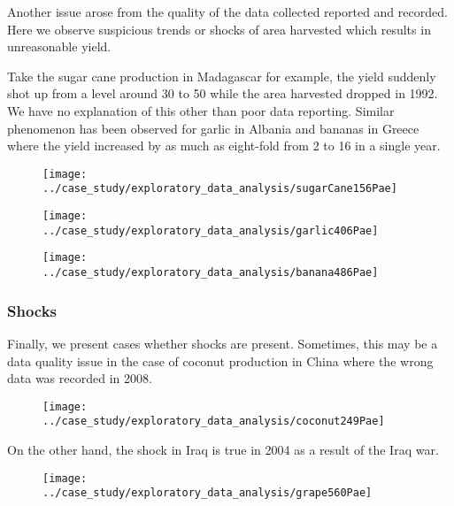 \documentclass[nojss]{jss}\usepackage[]{graphicx}\usepackage[]{color}
\begin{document}
Another issue arose from the quality of the data collected reported
and recorded. Here we observe suspicious trends or shocks of area
harvested which results in unreasonable yield.

Take the sugar cane production in Madagascar for example, the yield
suddenly shot up from a level around 30 to 50 while the area harvested
dropped in 1992. We have no explanation of this other than poor data
reporting. Similar phenomenon has been observed for garlic in Albania
and bananas in Greece where the yield increased by as much as
eight-fold from 2 to 16 in a single year.

\begin{figure}[!ht]
  \centering \texttt{[image: ../case\_study/exploratory\_data\_analysis/sugarCane156Pae]}
\end{figure}

\begin{figure}[!ht]
  \centering
  \texttt{[image: ../case\_study/exploratory\_data\_analysis/garlic406Pae]}
\end{figure}

\begin{figure}[!ht]
  \centering
  \texttt{[image: ../case\_study/exploratory\_data\_analysis/banana486Pae]}
\end{figure}




\FloatBarrier
\subsubsection{Shocks}

Finally, we present cases whether shocks are present. Sometimes, this
may be a data quality issue in the case of coconut production in China
where the wrong data was recorded in 2008.

\begin{figure}[!ht]
  \centering
  \texttt{[image: ../case\_study/exploratory\_data\_analysis/coconut249Pae]}
\end{figure}


On the other hand, the shock in Iraq is true in 2004 as a result of
the Iraq war.
\begin{figure}[!ht]
  \centering
  \texttt{[image: ../case\_study/exploratory\_data\_analysis/grape560Pae]}
\end{figure}
\end{document}
